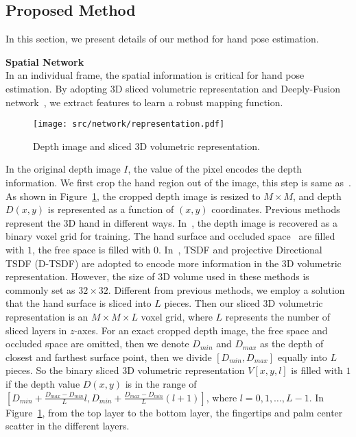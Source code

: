 \documentclass[journal,comsoc]{IEEEtran}
\let\MYoriglatexcaption\caption
\renewcommand{\caption}[2][\relax]{\MYoriglatexcaption[#2]{#2}}
\begin{document}
\subsection{Proposed Method}\label{sec:proposed method}
In this section, we present details of our method for hand pose estimation.\vspace{0.5em}

\noindent \textbf{Spatial Network}\vspace{0.5em}\label{sec:spatial network}\\
\indent In an individual frame, the spatial information is critical for hand pose estimation.
By adopting 3D sliced volumetric representation and Deeply-Fusion network~\cite{Chen_2017_CVPR}, we extract features
to learn a robust mapping function.

\begin{figure}[htbp]
\centering
    \texttt{[image: src/network/representation.pdf]}
    \caption{Depth image and sliced 3D volumetric representation.}
\label{fig:sliced 3D volumetric representation}
\end{figure}

In the original depth image $\mathit{I}$, the value of the pixel encodes the depth information.
We first crop the hand region out of the image, this step is same as~\cite{oberweger2015hands}.
As shown in Figure~\ref{fig:sliced 3D volumetric representation}, the cropped depth image is
resized to $M \times M$, and depth $D(x,y)$ is represented as a function of $(x,y)$ coordinates.
Previous methods represent the 3D hand in different ways.
In~\cite{III_2015_ICCV}, the depth image is recovered as a binary voxel grid for training. The hand surface and
occluded space~\cite{wu20153d} are filled with $1$, the free space is filled with $0$.
In~\cite{deng2017hand3d,Ge_2017_CVPR}, TSDF and projective Directional TSDF (D-TSDF) are adopted to
encode more information in the 3D volumetric representation. However, the size of 3D volume used in
these methods is commonly set as $32 \times 32$.
Different from previous methods, we employ a solution
that the hand surface is sliced into $L$ pieces. Then our sliced 3D volumetric
representation is an $M \times M \times L$ voxel grid, where $L$ represents the number of sliced layers
in $z$-axes. For an exact cropped depth image, the free space and occluded space are omitted, then we denote
$D_{min}$  and $D_{max}$ as the depth of closest and farthest surface point, then we divide $[D_{min}, D_{max}]$
equally into $L$ pieces. So the binary sliced 3D volumetric representation $V[x,y,l]$ is filled with $1$ if
the depth value $D(x,y)$ is in the range of $[D_{min} + \frac{D_{max} - D_{min}}{L}l, D_{min} +
\frac{D_{max} - D_{min}}{L}(l+1)]$, where $l=0, 1,\dots ,L-1$. In Figure~\ref{fig:sliced 3D volumetric representation},
from the top layer to the bottom layer, the fingertips and palm center scatter in the different layers.
\end{document}
